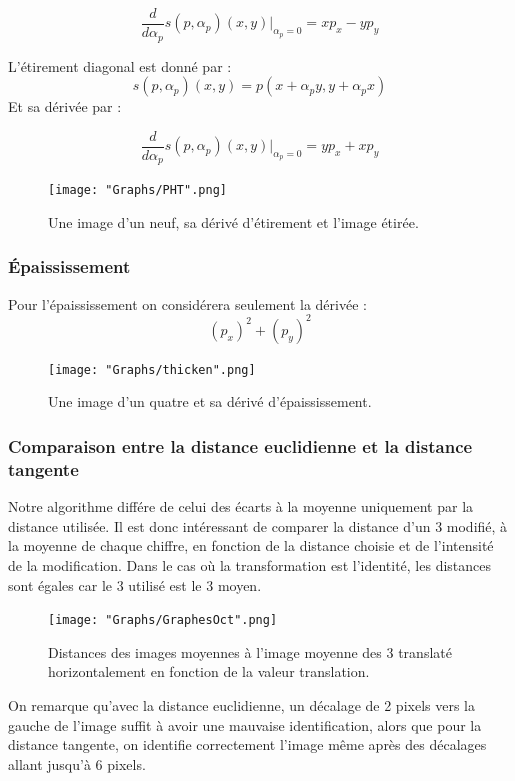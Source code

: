 \documentclass[a4paper,11pt,twoside]{report}
\begin{document}
$$\frac{d}{d\alpha_p}s(p,\alpha_p)(x,y)|_{\alpha_p=0}=xp_x-yp_y$$ 

L'étirement diagonal est donné par : $$s(p,\alpha_p)(x,y) = p(x+\alpha_py,y+\alpha_px)$$  
Et sa dérivée par :

$$\frac{d}{d\alpha_p}s(p,\alpha_p)(x,y)|_{\alpha_p=0}=yp_x+xp_y$$ 

\begin{figure}[H]
  	\texttt{[image: "Graphs/PHT".png]}
  	\caption{Une image d'un neuf, sa dérivé d'étirement et l'image étirée.}
\end{figure}

\subsubsection{Épaississement}
Pour l'épaississement on considérera seulement la dérivée \cite[p.~127]{Elden} : $$(p_x)^2+(p_y)^2$$


\begin{figure}[H]
\begin{center}


  	\texttt{[image: "Graphs/thicken".png]}
  	\caption{Une image d'un quatre et sa dérivé d'épaississement.}
  	\end{center}
\end{figure}


\subsubsection{Comparaison entre la distance euclidienne et la distance tangente}
Notre algorithme différe de celui des écarts à la moyenne uniquement par la distance utilisée. Il est donc intéressant de comparer la distance d'un 3 modifié, à la moyenne de chaque chiffre, en fonction de la distance choisie et de l'intensité de la modification. Dans le cas où la transformation est l'identité, les distances sont égales car le 3 utilisé est le 3 moyen.

\begin{figure}[H]
  	\texttt{[image: "Graphs/GraphesOct".png]}
  	\caption{Distances des images moyennes à l'image moyenne des 3 translaté horizontalement en fonction de la valeur translation.}
\end{figure}

On remarque qu'avec la distance euclidienne, un décalage de 2 pixels vers la gauche de l'image suffit à avoir une mauvaise identification, alors que pour la distance tangente, on identifie correctement l'image même après des décalages allant jusqu'à 6 pixels.
\end{document}
